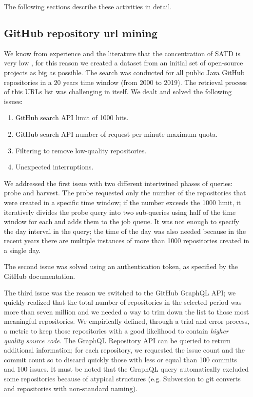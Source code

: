 The following sections describe these activities in detail.

\subsection{GitHub repository url mining}
We know from experience and the literature that the concentration of SATD is very low \cite{bavota2016large} \cite{maldonado2015detecting} \cite{potdar2014exploratory}, for this reason we created a dataset from an initial set of open-source projects as big as possible. 
The search was conducted for all public Java GitHub repositories in a 20 years time window (from 2000 to 2019). 
The retrieval process of this URLs list was challenging in itself. We dealt and solved the following issues:
\begin{enumerate}
    \item GitHub search API limit of 1000 hits.
    \item GitHub search API number of request per minute maximum quota.
    \item Filtering to remove low-quality repositories.
    \item Unexpected interruptions.
\end{enumerate}
We addressed the first issue with two different intertwined phases of queries: probe and harvest. The probe requested only the number of the repositories that were created in a specific time window; if the number exceeds the 1000 limit, it iteratively divides the probe query into two sub-queries using half of the time window for each and adds them to the job queue.
It was not enough to specify the day interval in the query; the time of the day was also needed because in the recent years there are multiple instances of more than 1000 repositories created in a single day.

The second issue was solved using an authentication token, as specified by the GitHub documentation.

The third issue was the reason we switched to the GitHub GraphQL API; we quickly realized that the total number of repositories in the selected period was more than seven million and we needed a way to trim down the list to those most meaningful repositories. We empirically defined, through a trial and error process, a metric to keep those repositories with a good likelihood to contain \textit{higher quality source code}. 
The GraphQL Repository API can be queried to return additional information; for each repository, we requested the issue count and the commit count so to discard quickly those with less or equal than 100 commits and 100 issues. It must be noted that the GraphQL query automatically excluded some repositories because of atypical structures (e.g. Subversion to git converts and repositories with non-standard naming). 

